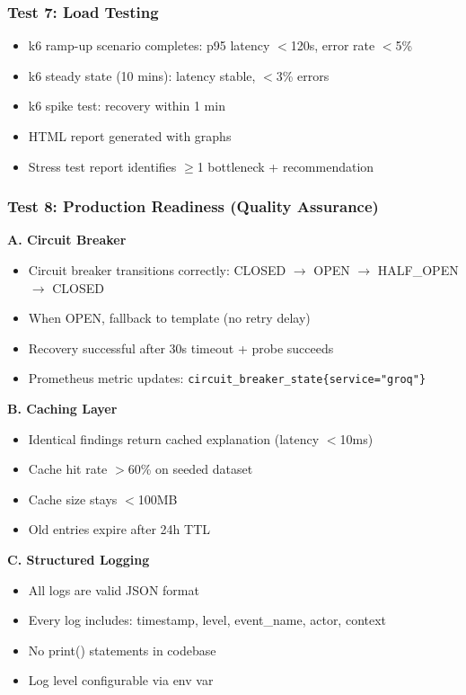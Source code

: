 \documentclass[11pt,a4paper]{article}
\begin{document}
\subsubsection{Test 7: Load Testing}
\begin{itemize}[leftmargin=*]
    \item k6 ramp-up scenario completes: p95 latency $<$120s, error rate $<$5\%
    \item k6 steady state (10 mins): latency stable, $<$3\% errors
    \item k6 spike test: recovery within 1 min
    \item HTML report generated with graphs
    \item Stress test report identifies $\geq$1 bottleneck + recommendation
\end{itemize}

\subsubsection{Test 8: Production Readiness (Quality Assurance)}

\textbf{A. Circuit Breaker}
\begin{itemize}[leftmargin=*]
    \item[$\checkmark$] Circuit breaker transitions correctly: CLOSED $\rightarrow$ OPEN $\rightarrow$ HALF\_OPEN $\rightarrow$ CLOSED
    \item[$\checkmark$] When OPEN, fallback to template (no retry delay)
    \item[$\checkmark$] Recovery successful after 30s timeout + probe succeeds
    \item[$\checkmark$] Prometheus metric updates: \texttt{circuit\_breaker\_state\{service="groq"\}}
\end{itemize}

\textbf{B. Caching Layer}
\begin{itemize}[leftmargin=*]
    \item[$\checkmark$] Identical findings return cached explanation (latency $<$10ms)
    \item[$\checkmark$] Cache hit rate $>$60\% on seeded dataset
    \item[$\checkmark$] Cache size stays $<$100MB
    \item[$\checkmark$] Old entries expire after 24h TTL
\end{itemize}

\textbf{C. Structured Logging}
\begin{itemize}[leftmargin=*]
    \item[$\checkmark$] All logs are valid JSON format
    \item[$\checkmark$] Every log includes: timestamp, level, event\_name, actor, context
    \item[$\checkmark$] No print() statements in codebase
    \item[$\checkmark$] Log level configurable via env var
\end{itemize}
\end{document}
